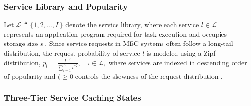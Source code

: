 \documentclass[journal]{IEEEtran}
\begin{document}
\subsubsection{Service Library and Popularity}

Let $\mathcal{L}\triangleq\{1,2,\dots,L\}$ denote the service library, where each service $l\in\mathcal{L}$ represents an application program required for task execution and occupies storage size $s_l$. Since service requests in MEC systems often follow a long-tail distribution, the request probability of service $l$ is modeled using a Zipf distribution, $p_l=\frac{l^{-\zeta}}{\sum_{i=1}^{L} i^{-\zeta}},\quad l\in\mathcal{L},
\label{eq:zipf}$
where services are indexed in descending order of popularity and $\zeta\geq0$ controls the skewness of the request distribution \cite{barman2025joint}.


\subsubsection{Three-Tier Service Caching States}
\end{document}
